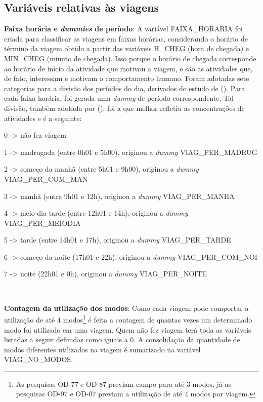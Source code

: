 \subsection{Variáveis relativas às viagens}\label{subsec:novas-var-viag}

\begin{compactitem}

\item \textbf{Faixa horária e \textit{dummies} de período}: A variável FAIXA_HORARIA foi criada para classificar as viagens em faixas horárias, considerando o horário de término da viagem obtido a partir das variáveis H_CHEG (hora de chegada) e MIN_CHEG (minuto de chegada).
Isso porque o horário de chegada corresponde ao horário de início da atividade que motivou a viagem, e são as atividades que, de fato, interessam e motivam o comportamento humano. 
Foram adotadas sete categorias para a divisão dos períodos do dia, derivados do estudo de  (\citeyear{VESPUCCI2003}).
Para cada faixa horária, foi gerada uma \textit{dummy} de período correspondente. Tal divisão, também adotada por  (\citeyear{GERMANI2005}), foi a que melhor refletiu as concentrações de atividades e é a seguinte:
    \begin{compactitem}[]
    \item 0 -> não fez viagem 
    \item 1 -> madrugada (entre 0h01 e 5h00), originou a \textit{dummy} VIAG_PER_MADRUG
    \item 2 -> começo da manhã (entre 5h01 e 9h00), originou a \textit{dummy} VIAG_PER_COM_MAN
    \item 3 -> manhã (entre 9h01 e 12h), originou a \textit{dummy} VIAG_PER_MANHA
    \item 4 -> meio-dia tarde (entre 12h01 e 14h), originou a \textit{dummy} VIAG_PER_MEIODIA
    \item 5 -> tarde (entre 14h01 e 17h), originou a \textit{dummy} VIAG_PER_TARDE
    \item 6 -> começo da noite (17h01 e 22h), originou a \textit{dummy} VIAG_PER_COM_NOI
    \item 7 -> noite (22h01 e 0h), originou a \textit{dummy} VIAG_PER_NOITE
    \end{compactitem}\

\item \textbf{Contagem da utilização dos modos}: Como cada viagem pode comportar a utilização de até 4 modos\footnote{As pesquisas OD-77 e OD-87 previam campo para até 3 modos, já as pesquisas OD-97 e OD-07 previam a utilização de até 4 modos por viagem.} é feita a contagem de quantas vezes um determinado modo foi utilizado em uma viagem.
Quem não fez viagem terá toda as variáveis listadas a seguir definidas como iguais a 0. A consolidação da quantidade de modos diferentes utilizados na viagem é sumarizado na variável VIAG_NO_MODOS. 


\end{compactitem}
